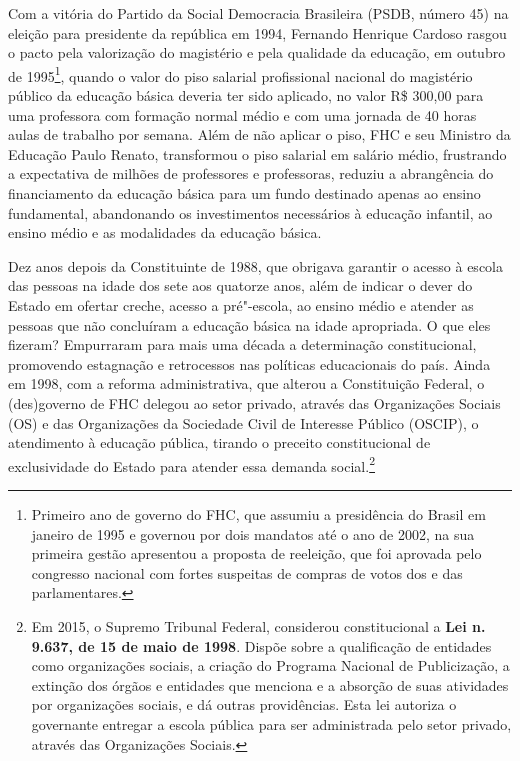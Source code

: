 Com a vitória do Partido da Social Democracia Brasileira (PSDB, número
45) na eleição para presidente da república em 1994, Fernando Henrique
Cardoso rasgou o pacto pela valorização do magistério e pela qualidade
da educação, em outubro de 1995\footnote{Primeiro ano de governo do FHC,
  que assumiu a presidência do Brasil em janeiro de 1995 e governou por
  dois mandatos até o ano de 2002, na sua primeira gestão apresentou a
  proposta de reeleição, que foi aprovada pelo congresso nacional com
  fortes suspeitas de compras de votos dos e das parlamentares.}, quando
o valor do piso salarial profissional nacional do magistério público da
educação básica deveria ter sido aplicado, no valor R\$ 300,00 para uma
professora com formação normal médio e com uma jornada de 40 horas aulas
de trabalho por semana. Além de não aplicar o piso, FHC e seu Ministro
da Educação Paulo Renato, transformou o piso salarial em salário médio,
frustrando a expectativa de milhões de professores e professoras,
reduziu a abrangência do financiamento da educação básica para um fundo
destinado apenas ao ensino fundamental, abandonando os investimentos
necessários à educação infantil, ao ensino médio e as modalidades da
educação básica.

Dez anos depois da Constituinte de 1988, que obrigava garantir o acesso
à escola das pessoas na idade dos sete aos quatorze anos, além de
indicar o dever do Estado em ofertar creche, acesso a pré"-escola, ao
ensino médio e atender as pessoas que não concluíram a educação básica
na idade apropriada. O que eles fizeram? Empurraram para mais uma década
a determinação constitucional, promovendo estagnação e retrocessos nas
políticas educacionais do país. Ainda em 1998, com a reforma
administrativa, que alterou a Constituição Federal, o (des)governo de
FHC delegou ao setor privado, através das Organizações Sociais (OS) e
das Organizações da Sociedade Civil de Interesse Público (OSCIP), o
atendimento à educação pública, tirando o preceito constitucional de
exclusividade do Estado para atender essa demanda social.\footnote{Em
  2015, o Supremo Tribunal Federal, considerou constitucional a
  \textbf{Lei n. 9.637, de 15 de maio de 1998}. Dispõe sobre a
  qualificação de entidades como organizações sociais, a criação do
  Programa Nacional de Publicização, a extinção dos órgãos e entidades
  que menciona e a absorção de suas atividades por organizações sociais,
  e dá outras providências. Esta lei autoriza o governante entregar a
  escola pública para ser administrada pelo setor privado, através das
  Organizações Sociais.}

